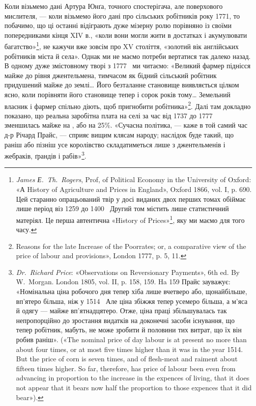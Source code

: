 
Коли візьмемо дані Артура Юнґа, точного спостерігача, але
поверхового мислителя, — коли візьмемо його дані про сільських
робітників року 1771, то побачимо, що ці останні відіграють дуже
мізерну ролю порівняно із своїми попередниками кінця XIV в.,
«коли вони могли жити в достатках і акумулювати багатство»\footnote{
\emph{James Е.~Th.~Rogers}, Prof, of Political Economy in the University
of Oxford: «А History of Agriculture and Prices in England», Oxford
1866, vol. I, p. 690. Цей старанно опрацьований твір у досі виданих двох
перших томах обіймає лише період віз 1259 до 1400~ Другий том містить
лише статистичний матеріял. Це перша автентична «History of Prices»\footnote*{
історія цін. \emph{Ред.}
},
яку ми маємо для того часу.
},
не кажучи вже зовсім про XV століття, «золотий вік англійських
робітників міста й села». Однак ми не маємо потреби
вертатися так далеко назад. В одному дуже змістовному творі
з 1777~ ми читаємо: «Великий фармер піднісся майже до рівня
джентельмена, тимчасом як бідний сільський робітник придушений
майже до землі\dots{} Його безталанне становище виявляється
цілком ясно, коли порівняти його становище тепер і сорок років
тому\dots{} Земельний власник і фармер спільно діють, щоб пригнобити
робітника»\footnote{
Reasons for the late Increase of the Poorrates; or, a comparative
view of the price of labour and provisions», London 1777, p. 5, 11.
}. Далі там докладно показано, що реальна
заробітна плата на селі за час від 1737 до 1777~ зменшилась
майже на ,  або на 25\%. «Сучасна політика, — каже в той самий
час д-р Річард Прайс, — сприяє вищим клясам народу; наслідок
буде такий, що раніш або пізніш усе королівство складатиметься
лише з джентельменів і жебраків, ґрандів і рабів»\footnote{
\emph{Dr.~Richard Price}: «Observations on Reversionary Payments»,
6th ed. By W.~Morgan. London 1805, vol. II, p. 158, 159. Ha \stor{}159
Прайс зауважує: «Номінальна ціна робочого дня тепер хіба лише вчетверо
або, щонайбільше, вп’ятеро більша, ніж у 1514~ Але ціна збіжжя тепер
усемеро більша, а м’яса й одягу — майже вп’ятнадцятеро. Отже, ціна
праці збільшувалась так непропорційно до зростання видатків на доконечні
засоби існування, що тепер робітник, мабуть, не може зробити й
половини тих витрат, що їх він робив раніш». («The nominal price of
day labour is at present no more than about four times, or at most five times
higher than it was in the year 1514. But the price of corn is seven times,
and of flesh-meat and raiment about fifteen times higher. So far, therefore,
has price of labour been even from advancing in proportion to the
increase in the expences of living, that it does not appear that it bears now
half the proportion to those expences that it did bear»).
}.

